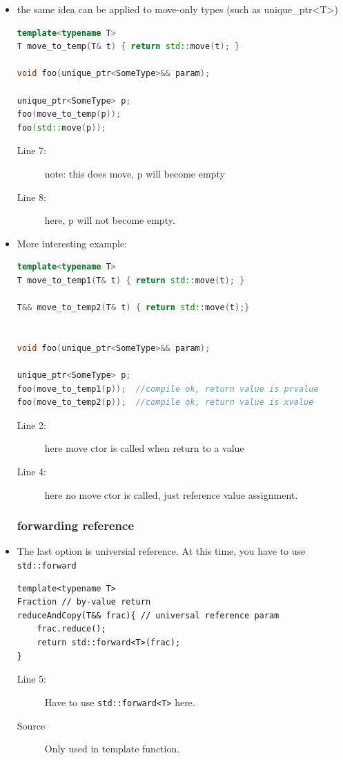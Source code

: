 \documentclass[a4paper,11pt,twoside]{book}
\begin{document}
\begin{itemize}
\item the same idea can be applied to move-only types (such as unique\_ptr<T>)
\begin{lstlisting}[frame=single, language=c++]
template<typename T>
T move_to_temp(T& t) { return std::move(t); }

void foo(unique_ptr<SomeType>&& param);

unique_ptr<SomeType> p;
foo(move_to_temp(p)); 
foo(std::move(p)); 
\end{lstlisting}
\begin{description}
	\item[Line 7:] note: this does move, p will become empty
	\item[Line 8:] here, p will not become empty. 
\end{description}


\item More interesting example:
\begin{lstlisting}[frame=single, language=c++]
template<typename T>
T move_to_temp1(T& t) { return std::move(t); }

T&& move_to_temp2(T& t) { return std::move(t);}


void foo(unique_ptr<SomeType>&& param);

unique_ptr<SomeType> p;
foo(move_to_temp1(p));  //compile ok, return value is prvalue
foo(move_to_temp2(p));  //compile ok, return value is xvalue
\end{lstlisting}
\begin{description}
	\item[Line 2:] here move ctor is called when return to a value
	\item[Line 4:] here no move ctor is called, just reference value assignment.
\end{description}


\subsubsection{forwarding reference}

\item The last option is universial reference. At this time, you have to use \texttt{std::forward} 
\begin{lstlisting}[]
template<typename T>
Fraction // by-value return
reduceAndCopy(T&& frac){ // universal reference param
	frac.reduce();
	return std::forward<T>(frac); 
} 
\end{lstlisting}
\begin{description}
	\item[Line 5:] Have to use \texttt{std::forward<T>} here.
	\item[Source] Only used in template function.
\end{description}

\end{itemize}
\end{document}
